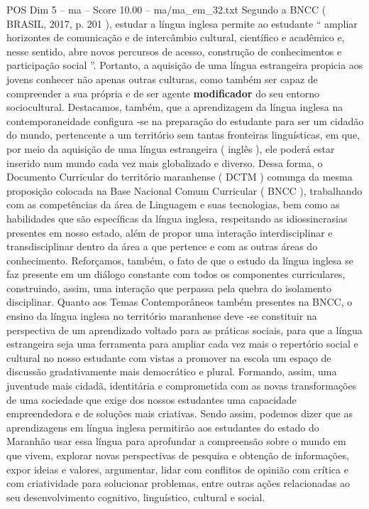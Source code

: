 \begin{textsample}{POS Dim 5 – ma – Score 10.00 – ma/ma\_em\_32.txt}
Segundo a BNCC ( BRASIL, 2017, p. 201 ), estudar a língua inglesa permite ao estudante “ ampliar horizontes de comunicação e de intercâmbio cultural, científico e acadêmico e, nesse sentido, abre novos percursos de acesso, construção de conhecimentos e participação social ”.
Portanto, a aquisição de uma língua estrangeira propicia aos jovens conhecer não apenas outras culturas, como também ser capaz de compreender a sua própria e de ser agente \textbf{modificador} do seu entorno sociocultural.
Destacamos, também, que a aprendizagem da língua inglesa na contemporaneidade configura -se na preparação do estudante para ser um cidadão do mundo, pertencente a um território sem tantas fronteiras linguísticas, em que, por meio da aquisição de uma língua estrangeira ( inglês ), ele poderá estar inserido num mundo cada vez mais globalizado e diverso.
Dessa forma, o Documento Curricular do território maranhense ( DCTM ) comunga da mesma proposição colocada na Base Nacional Comum Curricular ( BNCC ), trabalhando com as competências da área de Linguagem e suas tecnologias, bem como as habilidades que são específicas da língua inglesa, respeitando as idiossincrasias presentes em nosso estado, além de propor uma interação interdisciplinar e transdisciplinar dentro da área a que pertence e com as outras áreas do conhecimento.
Reforçamos, também, o fato de que o estudo da língua inglesa se faz presente em um diálogo constante com todos os componentes curriculares, construindo, assim, uma interação que perpassa pela quebra do isolamento disciplinar.
Quanto aos Temas Contemporâneos também presentes na BNCC, o ensino da língua inglesa no território maranhense deve -se constituir na perspectiva de um aprendizado voltado para as práticas sociais, para que a língua estrangeira seja uma ferramenta para ampliar cada vez mais o repertório social e cultural no nosso estudante com vistas a promover na escola um espaço de discussão gradativamente mais democrático e plural.
Formando, assim, uma juventude mais cidadã, identitária e comprometida com as novas transformações de uma sociedade que exige dos nossos estudantes uma capacidade empreendedora e de soluções mais criativas.
Sendo assim, podemos dizer que as aprendizagens em língua inglesa permitirão aos estudantes do estado do Maranhão usar essa língua para aprofundar a compreensão sobre o mundo em que vivem, explorar novas perspectivas de pesquisa e obtenção de informações, expor ideias e valores, argumentar, lidar com conflitos de opinião com crítica e com criatividade para solucionar problemas, entre outras ações relacionadas ao seu desenvolvimento cognitivo, linguístico, cultural e social.

\end{textsample}
